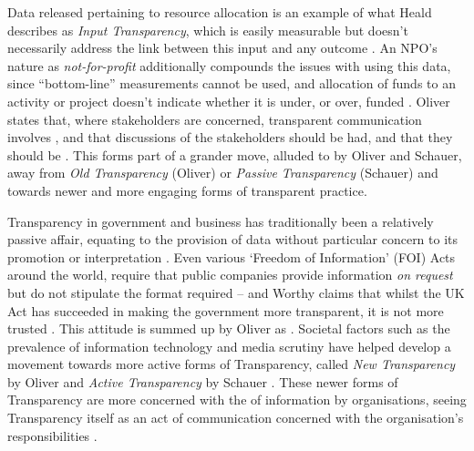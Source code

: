 Data released pertaining to resource allocation is an example of what Heald describes as \textit{Input Transparency}, which is easily measurable but doesn't necessarily address the link between this input and any outcome \cite{heald_fiscal_2003, heald_varieties_2006}. An NPO's nature as \textit{not-for-profit} additionally compounds the issues with using this data, since ``bottom-line'' measurements cannot be used, and allocation of funds to an activity or project doesn't indicate whether it is under, or over, funded \cite{henderson_performance_2002}. Oliver states that, where stakeholders are concerned, transparent communication involves , and that discussions of the stakeholders  should be had, and that they should be  \cite{oliver_what_2004}. This forms part of a grander move, alluded to by Oliver and Schauer, away from \textit{Old Transparency} (Oliver) or \textit{Passive Transparency} (Schauer) and towards newer and more engaging forms of transparent practice.

Transparency in government and business has traditionally been a relatively passive affair, equating to the provision of data without particular concern to its promotion or interpretation \cite{schauer_transparency_2011, oliver_what_2004}. Even various `Freedom of Information' (FOI) Acts around the world, require that public companies provide information \textit{on request} but do not stipulate the format required -- and Worthy claims that whilst the UK Act has succeeded in making the government more transparent, it is not more trusted \cite{hood_transparency_2006-1, _freedom_2000, worthy_more_2010}. This attitude is summed up by Oliver as  \cite{oliver_what_2004}. Societal factors such as the prevalence of information technology and media scrutiny have helped develop a movement towards more active forms of Transparency, called \textit{New Transparency} by Oliver and \textit{Active Transparency} by Schauer \cite{oliver_what_2004, schauer_transparency_2011}. These newer forms of Transparency are more concerned with the  of information by organisations, seeing Transparency itself as an act of communication concerned with the organisation's responsibilities \cite{schauer_transparency_2011, oliver_what_2004}.

